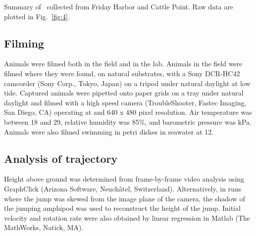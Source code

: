 \documentclass{jeb}
\newcommand{\Hyale}{\Genus{H.~pugettensis}}
\begin{document}


\begin{table}
\caption{Summary of \Hyale\ collected from Friday Harbor and Cattle Point.  Raw data are plotted in Fig.~\ref{fig:4}.}
\label{table:1}
\end{table}

\subsection{Filming}
	Animals were filmed both in the field and in the lab.  Animals in the field were filmed where they were found, on natural substrates, with a Sony DCR-HC42 camcorder (Sony Corp., Tokyo, Japan) on a tripod under natural daylight at low tide.  Captured animals were pipetted onto paper grids on a tray under natural daylight and filmed with a high speed camera (TroubleShooter, Fastec Imaging, San Diego, CA) operating at  and 640 x  480 pixel resolution.  Air temperature was between 18 and 29\degC, relative humidity was 85\%, and barometric pressure was \unit[102]{kPa}.  Animals were also filmed swimming in petri dishes in seawater at 12\degC.  

\subsection{Analysis of trajectory}
	Height above ground was determined from frame-by-frame video analysis using GraphClick (Arizona Software, Neuch\^{a}tel, Switzerland).  Alternatively, in runs where the jump was skewed from the image plane of the camera, the shadow of the jumping amphipod was used to reconstruct the height of the jump.  Initial velocity and rotation rate were also obtained by linear regression in Matlab (The MathWorks, Natick, MA).  
\end{document}
